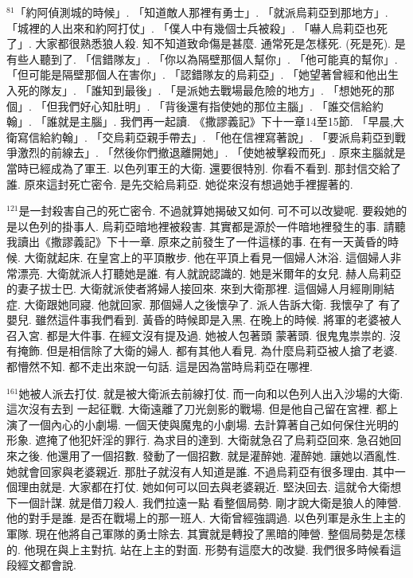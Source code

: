 \documentclass{book}
\begin{document}
$^{81}$「約阿偵測城的時候」.
「知道敵人那裡有勇士」.
「就派烏莉亞到那地方」.
「城裡的人出來和約阿打仗」.
「僕人中有幾個士兵被殺」.
「嚇人烏莉亞也死了」.
大家都很熟悉狼人殺.
知不知道致命傷是甚麼.
通常死是怎樣死.
(死是死).
是 有些人聽到了.
「信錯隊友」.
「你以為隔壁那個人幫你」.
「他可能真的幫你」.
「但可能是隔壁那個人在害你」.
「認錯隊友的烏莉亞」.
「她望著曾經和他出生入死的隊友」.
「誰知到最後」.
「是派她去戰場最危險的地方」.
「想她死的那個」.
「但我們好心知肚明」.
「背後還有指使她的那位主腦」.
「誰交信給約翰」.
「誰就是主腦」.
我們再一起讀.
《撒謬義記》下十一章14至15節.
「早晨,大衛寫信給約翰」.
「交烏莉亞親手帶去」.
「他在信裡寫著說」.
「要派烏莉亞到戰爭激烈的前線去」.
「然後你們撤退離開她」.
「使她被擊殺而死」.
原來主腦就是當時已經成為了軍王.
以色列軍王的大衛.
還要很特別.
你看不看到.
那封信交給了誰.
原來這封死亡密令.
是先交給烏莉亞.
她從來沒有想過她手裡握著的.

$^{121}$是一封殺害自己的死亡密令.
不過就算她揭破又如何.
可不可以改變呢.
要殺她的是以色列的掛事人.
烏莉亞暗地裡被殺害.
其實都是源於一件暗地裡發生的事.
請聽我讀出《撒謬義記》下十一章.
原來之前發生了一件這樣的事.
在有一天黃昏的時候.
大衛就起床.
在皇宮上的平頂散步.
他在平頂上看見一個婦人沐浴.
這個婦人非常漂亮.
大衛就派人打聽她是誰.
有人就說認識的.
她是米爾年的女兒.
赫人烏莉亞的妻子拔士巴.
大衛就派使者將婦人接回來.
來到大衛那裡.
這個婦人月經剛剛結症.
大衛跟她同寢.
他就回家.
那個婦人之後懷孕了.
派人告訴大衛.
我懷孕了 有了嬰兒.
雖然這件事我們看到.
黃昏的時候即是入黑.
在晚上的時候.
將軍的老婆被人召入宮.
都是大件事.
在經文沒有提及過.
她被人包著頭 蒙著頭.
很鬼鬼祟祟的.
沒有掩飾.
但是相信除了大衛的婦人.
都有其他人看見.
為什麼烏莉亞被人搶了老婆.
都懵然不知.
都不走出來說一句話.
這是因為當時烏莉亞在哪裡.

$^{161}$她被人派去打仗.
就是被大衛派去前線打仗.
而一向和以色列人出入沙場的大衛.
這次沒有去到 一起征戰.
大衛遠離了刀光劍影的戰場.
但是他自己留在宮裡.
都上演了一個內心的小劇場.
一個天使與魔鬼的小劇場.
去計算著自己如何保住光明的形象.
遮掩了他犯奸淫的罪行.
為求目的達到.
大衛就急召了烏莉亞回來.
急召她回來之後.
他還用了一個招數.
發動了一個招數.
就是灌醉她.
灌醉她.
讓她以酒亂性.
她就會回家與老婆親近.
那肚子就沒有人知道是誰.
不過烏莉亞有很多理由.
其中一個理由就是.
大家都在打仗.
她如何可以回去與老婆親近.
堅決回去.
這就令大衛想下一個計謀.
就是借刀殺人.
我們拉遠一點 看整個局勢.
剛才說大衛是狼人的陣營.
他的對手是誰.
是否在戰場上的那一班人.
大衛曾經強調過.
以色列軍是永生上主的軍隊.
現在他將自己軍隊的勇士除去.
其實就是轉投了黑暗的陣營.
整個局勢是怎樣的.
他現在與上主對抗.
站在上主的對面.
形勢有這麼大的改變.
我們很多時候看這段經文都會說.
\end{document}
